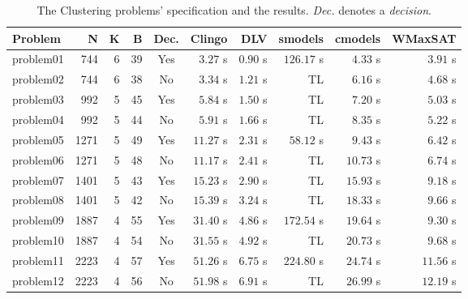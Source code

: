 \documentclass[]{article}
\begin{document}
\begin{table}[h]
\caption{The Clustering problems' specification and the results. \textit{Dec.} denotes a \textit{decision}.}
\label{tab:clustering_results}
\vspace{1em}
\scriptsize
\begin{tabular}{lrrrcrrrrr}
\toprule
Problem & N & K & B & Dec. & Clingo & DLV & smodels & cmodels & WMaxSAT \\
\midrule
problem01 & 744 & 6 & 39 & Yes  & $  3.27 $ s   & $ 0.90 $ s    & $ 126.17 $ s  & $ 4.33 $ s    & $ 3.91 $ s \\
problem02 & 744 & 6 & 38 & No   & $ 3.34 $ s    & $ 1.21 $ s    & TL            & $ 6.16 $ s    & $ 4.68 $ s \\
problem03 & 992 & 5 & 45 & Yes  & $ 5.84 $ s    & $ 1.50 $ s    & TL            & $ 7.20 $ s    & $ 5.03 $ s \\
problem04 & 992 & 5 & 44 & No   & $ 5.91 $ s    & $ 1.66 $ s    & TL            & $ 8.35 $ s    & $ 5.22 $ s \\
problem05 & 1271 & 5 & 49 & Yes & $ 11.27 $ s   & $ 2.31 $ s    & $ 58.12 $ s   & $ 9.43 $ s    & $ 6.42 $ s \\
problem06 & 1271 & 5 & 48 & No  & $ 11.17 $ s   & $ 2.41 $ s    & TL            & $ 10.73 $ s   & $ 6.74 $ s \\
problem07 & 1401 & 5 & 43 & Yes & $ 15.23 $ s   & $ 2.90 $ s    & TL            & $ 15.93 $ s   & $ 9.18 $ s \\
problem08 & 1401 & 5 & 42 & No  & $ 15.39 $ s   & $ 3.24 $ s    & TL            & $ 18.33 $ s   & $ 9.66 $ s \\
problem09 & 1887 & 4 & 55 & Yes & $ 31.40 $ s   & $ 4.86 $ s    & $ 172.54 $ s  & $ 19.64 $ s   & $ 9.30 $ s \\
problem10 & 1887 & 4 & 54 & No  & $ 31.55 $ s   & $ 4.92 $ s    & TL            & $ 20.73 $ s   & $ 9.68 $ s \\
problem11 & 2223 & 4 & 57 & Yes & $ 51.26 $ s   & $ 6.75 $ s    & $ 224.80 $ s  & $ 24.74 $ s   & $ 11.56 $ s \\
problem12 & 2223 & 4 & 56 & No  & $ 51.98 $ s   & $ 6.91 $ s    & TL            & $ 26.99 $ s   & $ 12.19 $ s \\
\bottomrule
\end{tabular}
\end{table}



\end{document}
